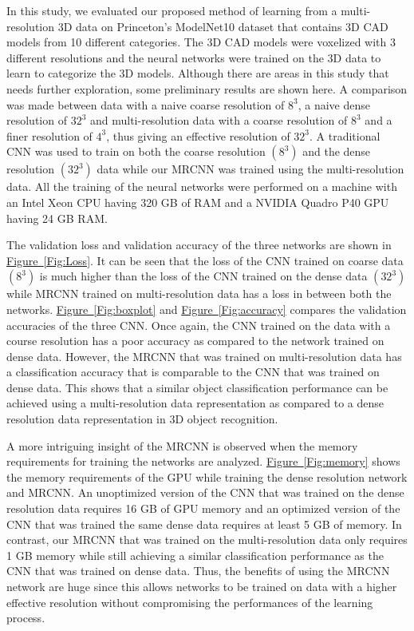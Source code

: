 \documentclass[10pt,letterpaper]{article}
\newcommand{\cref}[2]{\hyperref[#2]{#1~\ref*{#2}}}
\begin{document}
In this study, we evaluated our proposed method of learning from a multi-resolution 3D data on Princeton's ModelNet10 dataset that contains 3D CAD models from 10 different categories. The 3D CAD models were voxelized with 3 different resolutions and the neural networks were trained on the 3D data to learn to categorize the 3D models.
Although there are areas in this study that needs further exploration, some preliminary results are shown here. A comparison was made between data with a naive coarse resolution of $8^3$, a naive dense resolution of $32^3$ and multi-resolution data with a coarse resolution of $8^3$ and a finer resolution of $4^3$, thus giving an effective resolution of $32^3$. A traditional CNN was used to train on both the coarse resolution $(8^3)$ and the dense resolution $(32^3)$ data while our MRCNN was trained using the multi-resolution data. All the training of  the neural networks were performed on a machine with an Intel Xeon CPU having 320 GB of RAM and a NVIDIA Quadro P40 GPU having 24 GB RAM.



The validation loss and validation accuracy of the three networks are shown in \cref{Figure}{Fig:Loss}. It can be seen that the loss of the CNN trained on coarse data $(8^3)$ is much higher than the loss of the CNN trained on the dense data $(32^3)$  while MRCNN trained on multi-resolution data has a loss in between both the networks. \cref{Figure}{Fig:boxplot} and \cref{Figure}{Fig:accuracy} compares the validation accuracies of the three CNN. Once again, the CNN trained on the data with a course resolution has a poor accuracy as compared to the network trained on dense data. However, the MRCNN that was trained on multi-resolution data has a classification accuracy that is comparable to the CNN that was trained on dense data. This shows that a similar object classification performance can be achieved using a multi-resolution data representation as compared to a dense resolution data representation in 3D object recognition.


A more intriguing insight of the MRCNN is observed when the memory requirements for training the networks are analyzed. \cref{Figure}{Fig:memory} shows the memory requirements of the GPU while training the dense resolution network and MRCNN.  An unoptimized version of the CNN that was trained on the dense resolution data requires 16 GB of GPU memory and an optimized version of the CNN that was trained the same dense data requires at least 5 GB of memory. In contrast, our MRCNN that was trained on the multi-resolution data only requires 1 GB memory while still achieving a similar classification performance as the CNN that was trained on dense data. Thus, the benefits of using the MRCNN network are huge since this allows networks to be trained on data with a higher effective resolution without compromising the performances of the learning process.
\end{document}
